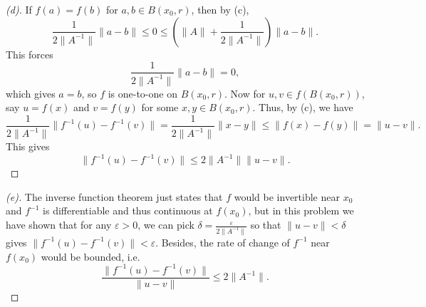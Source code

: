 \begin{proof}[(d)]
    If \(f(a) = f(b)\) for \(a, b \in B(x_0, r)\), then by (c),
    \[
        \frac{1}{2\lVert A^{-1} \rVert } \lVert a-b \rVert \le 0 \le \left( \lVert A \rVert + \frac{1}{2 \lVert A^{-1} \rVert }  \right) \lVert a-b \rVert.   
    \]  
    This forces
    \[
        \frac{1}{2\lVert A^{-1} \rVert } \lVert a-b \rVert = 0, 
    \]
    which gives \(a = b\), so \(f\) is one-to-one on \(B(x_0, r)\). Now for \(u, v \in f(B(x_0, r))\), say \(u = f(x)\) and \(v = f(y)\) for some \(x, y \in B(x_0, r)\). Thus, by (c), we have 
    \[
        \frac{1}{2\lVert A^{-1} \rVert } \lVert f^{-1}(u) - f^{-1}(v) \rVert = \frac{1}{2 \lVert A^{-1} \rVert } \lVert x-y \rVert \le \lVert f(x) - f(y) \rVert = \lVert u - v \rVert.    
    \]       
    This gives 
    \[
        \lVert f^{-1}(u) - f^{-1}(v) \rVert \le 2\lVert A^{-1} \rVert \lVert u-v \rVert.
    \]
\end{proof}

\begin{proof}[(e)]
    The inverse function theorem just states that \(f\) would be invertible near \(x_0\) and \(f^{-1}\) is differentiable and thus continuous at \(f(x_0)\), but in this problem we have shown that for any \(\varepsilon > 0\), we can pick \(\delta = \frac{\varepsilon}{2 \lVert A^{-1} \rVert }\) so that \(\lVert u - v \rVert < \delta  \) gives \(\lVert f^{-1}(u) - f^{-1}(v) \rVert < \varepsilon \). Besides, the rate of change of \(f^{-1}\) near \(f(x_0)\) would be bounded, i.e. 
    \[
        \frac{\lVert f^{-1}(u) - f^{-1}(v) \rVert }{\lVert u - v \rVert } \le 2 \lVert A^{-1} \rVert. 
    \]    
\end{proof}